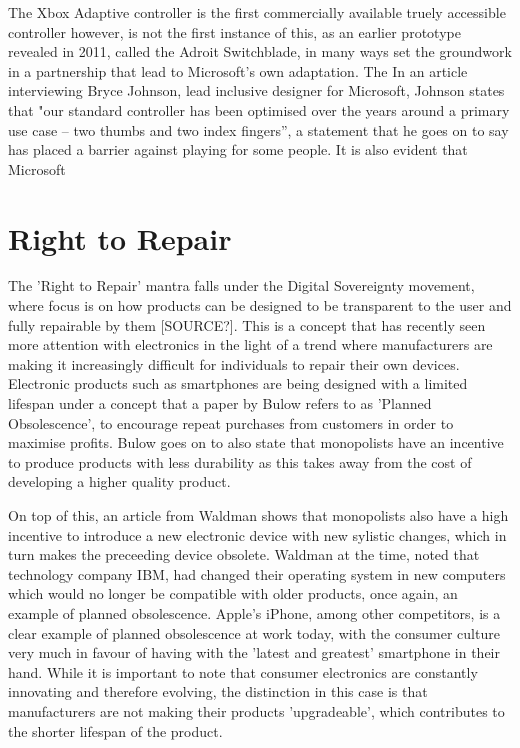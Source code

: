 The Xbox Adaptive controller is the first commercially available truely accessible controller however, is not the first instance of this, as an earlier prototype revealed in 2011, called the Adroit Switchblade\cite{ablegamer}, in many ways set the groundwork in a partnership that lead to Microsoft's own adaptation.
The 
In an article interviewing Bryce Johnson, lead inclusive designer for Microsoft, Johnson states that "our standard controller has been optimised over the years around a primary use case – two thumbs and two index fingers”\cite{disabilitygaming}, a statement that he goes on to say has placed a barrier against playing for some people.
It is also evident that Microsoft %



\section{Right to Repair}

The 'Right to Repair' mantra falls under the Digital Sovereignty movement, where focus is on how products can be designed to be transparent to the user and fully repairable by them [SOURCE?].
This is a concept that has recently seen more attention with electronics in the light of a trend where manufacturers are making it increasingly difficult for individuals to repair their own devices.
Electronic products such as smartphones are being designed with a limited lifespan under a concept that a paper by Bulow\cite{obsolescence} refers to as 'Planned Obsolescence', to encourage repeat purchases from customers in order to maximise profits.
Bulow goes on to also state that monopolists have an incentive to produce products with less durability as this takes away from the cost of developing a higher quality product.

On top of this, an article from Waldman shows that monopolists also have a high incentive to introduce a new electronic device with new sylistic changes, which in turn makes the preceeding device obsolete\cite{obsolescence2}.
Waldman at the time, noted that technology company IBM, had changed their operating system in new computers which would no longer be compatible with older products, once again, an example of planned obsolescence.
Apple's iPhone, among other competitors, is a clear example of planned obsolescence at work today, with the consumer culture very much in favour of having with the 'latest and greatest' smartphone in their hand.
While it is important to note that consumer electronics are constantly innovating and therefore evolving, the distinction in this case is that manufacturers are not making their products 'upgradeable', which contributes to the shorter lifespan of the product.

